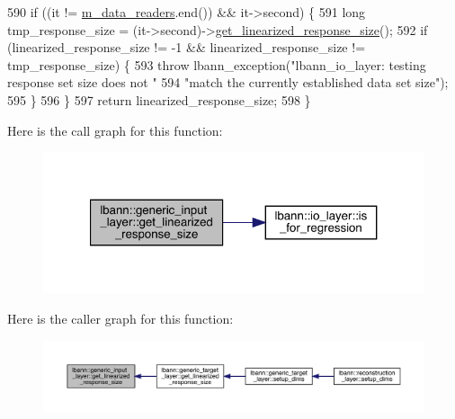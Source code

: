 \begin{DoxyCode}
590     \textcolor{keywordflow}{if} ((it != \hyperlink{classlbann_1_1generic__input__layer_a6bc18860c02beed0252ea3cc87bc48d2}{m\_data\_readers}.end()) && it->second) \{
591       \textcolor{keywordtype}{long} tmp\_response\_size = (it->second)->\hyperlink{classlbann_1_1generic__input__layer_a6e5e587aa5b32bdfd2dd579a2746885d}{get\_linearized\_response\_size}();
592       \textcolor{keywordflow}{if} (linearized\_response\_size != -1 && linearized\_response\_size != tmp\_response\_size) \{
593         \textcolor{keywordflow}{throw} lbann\_exception(\textcolor{stringliteral}{"lbann\_io\_layer: testing response set size does not "}
594                               \textcolor{stringliteral}{"match the currently established data set size"});
595       \}
596     \}
597     \textcolor{keywordflow}{return} linearized\_response\_size;
598   \}
\end{DoxyCode}
Here is the call graph for this function\+:\nopagebreak
\begin{figure}[H]
\begin{center}
\leavevmode
\includegraphics[width=321pt]{classlbann_1_1generic__input__layer_a6e5e587aa5b32bdfd2dd579a2746885d_cgraph}
\end{center}
\end{figure}
Here is the caller graph for this function\+:\nopagebreak
\begin{figure}[H]
\begin{center}
\leavevmode
\includegraphics[width=350pt]{classlbann_1_1generic__input__layer_a6e5e587aa5b32bdfd2dd579a2746885d_icgraph}
\end{center}
\end{figure}
\mbox{\label{classlbann_1_1generic__input__layer_a8af40ec1991900bf23b78e6429256b9c}} 
